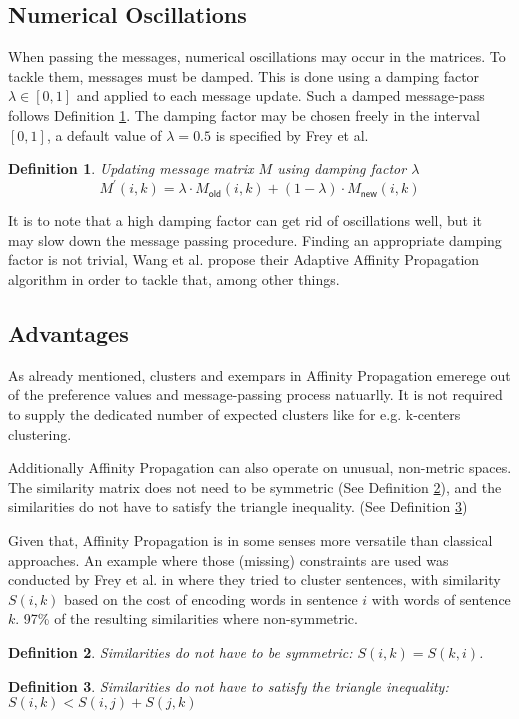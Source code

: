 \documentclass[11pt,a4paper]{article}
\newtheorem{definition}{Definition}
\begin{document}
\subsection{Numerical Oscillations}
When passing the messages, numerical oscillations may occur in the matrices. To tackle them, messages must be damped. This is done using a damping factor $\lambda \in \left[0,1\right]$ and applied to each message update. Such a damped message-pass follows Definition \ref{def:dampupdate}. The damping factor may be chosen freely in the interval $[0,1]$, a default value of $\lambda = 0.5$ is specified by Frey et al. \cite{frey2007clustering}
\begin{definition}\label{def:dampupdate}
	Updating message matrix $M$ using damping factor $\lambda$
	\[
		M^\prime (i,k) =\lambda \cdot M_{\mathsf{old}}(i,k) + (1-\lambda) \cdot M_{\mathsf{new}} (i,k)
	\]
\end{definition}
It is to note that a high damping factor can get rid of oscillations well, but it may slow down the message passing procedure. \cite{wang2008adaptive} Finding an appropriate damping factor is not trivial, Wang et al. propose their Adaptive Affinity Propagation algorithm in order to tackle that, among other things. \cite{wang2008adaptive}
\pagebreak
\subsection{Advantages}
As already mentioned, clusters and exempars in Affinity Propagation emerege out of the preference values and message-passing process natuarlly. It is not required to supply the dedicated number of expected clusters like for e.g. k-centers clustering. \cite{frey2007clustering}

Additionally Affinity Propagation can also operate on unusual, non-metric spaces. The similarity matrix does not need to be symmetric (See Definition \ref{def:symmetric}), and the similarities do not have to satisfy the triangle inequality. (See Definition \ref{def:triangleieq}) \cite{frey2007clustering}

Given that, Affinity Propagation is in some senses more versatile than classical approaches. An example where those (missing) constraints are used was conducted by Frey et al. in \cite{frey2007clustering} where they tried to cluster sentences, with similarity $S(i,k)$ based on the cost of encoding words in sentence $i$ with words of sentence $k$. 97\% of the resulting similarities where non-symmetric. \cite{frey2007clustering} 
\begin{definition}\label{def:symmetric}
	Similarities do not have to be symmetric: $S(i,k) = S(k,i)$.
\end{definition}
\begin{definition}\label{def:triangleieq}
	Similarities do not have to satisfy the triangle inequality: $S(i,k) < S(i,j) + S(j,k)$
\end{definition}
\end{document}
